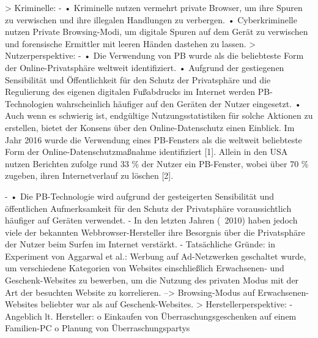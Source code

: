 	
	> Kriminelle: 
		- \cite{Mahlous.2020}
			•	Kriminelle nutzen vermehrt private Browser, um ihre Spuren zu verwischen und ihre illegalen Handlungen zu verbergen.
			•	Cyberkriminelle nutzen Private Browsing-Modi, um digitale Spuren auf dem Gerät zu verwischen und forensische Ermittler mit leeren Händen dastehen zu lassen.	
	> Nutzerperspektive:
		- \cite{Horsman.2019}
			•	Die Verwendung von PB wurde als die beliebteste Form der Online-Privatsphäre weltweit identifiziert.
			•	Aufgrund der gestiegenen Sensibilität und Öffentlichkeit für den Schutz der Privatsphäre und die Regulierung des eigenen digitalen Fußabdrucks im Internet werden PB-Technologien wahrscheinlich häufiger auf den Geräten der Nutzer eingesetzt. 
			•	Auch wenn es schwierig ist, endgültige Nutzungsstatistiken für solche Aktionen zu erstellen, bietet der Konsens über den Online-Datenschutz einen Einblick. Im Jahr 2016 wurde die Verwendung eines PB-Fensters als die weltweit beliebteste Form der Online-Datenschutzmaßnahme identifiziert [1]. Allein in den USA nutzen Berichten zufolge rund 33 \% der Nutzer ein PB-Fenster, wobei über 70 \% zugeben, ihren Internetverlauf zu löschen [2].
			
		- \cite{Horsman.2019} •	Die PB-Technologie wird aufgrund der gesteigerten Sensibilität und öffentlichen Aufmerksamkeit für den Schutz der Privatsphäre voraussichtlich häufiger auf Geräten verwendet.
		- \cite{Said.2011} In den letzten Jahren (~2010) haben jedoch viele der bekannten Webbrowser-Hersteller ihre Besorgnis über die Privatsphäre der Nutzer beim Surfen im Internet verstärkt.
		- Tatsächliche Gründe: \cite{Montasari.2015} in \cite{Aggarwal.2010} Experiment von Aggarwal et al.: Werbung auf Ad-Netzwerken geschaltet wurde, um verschiedene Kategorien von Websites einschließlich Erwachsenen- und Geschenk-Websites zu bewerben, um die Nutzung des privaten Modus mit der Art der besuchten Website zu korrelieren.
			--> Browsing-Modus auf Erwachsenen-Websites beliebter war als auf Geschenk-Websites.
	> Herstellerperspektive:
		- \cite{Montasari.2015} Angeblich lt. Hersteller: 
			o	Einkaufen von Überraschungsgeschenken auf einem Familien-PC 
			o	Planung von Überraschungspartys 
				

